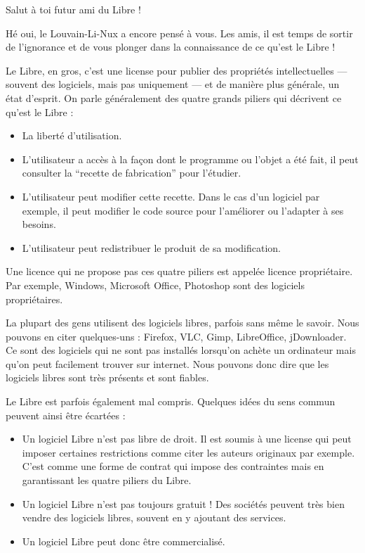 \documentclass[12pt]{../fiche}
\begin{document}


Salut à toi futur ami du Libre ! 
\vspace{0.8em}

Hé oui, le Louvain-Li-Nux a encore pensé à vous. Les amis, il est temps de sortir de l'ignorance et de vous plonger dans la connaissance de ce qu'est le Libre !
\vspace{0.8em}

Le Libre, en gros, c'est une license pour publier des propriétés intellectuelles --- souvent des logiciels, mais pas uniquement --- et de manière plus générale, un état d'esprit. On parle généralement des \og{}quatre grands piliers\fg{} qui décrivent ce qu'est le Libre :
\begin{itemize}
\item La liberté d'utilisation.
\item L'utilisateur a accès à la façon dont le programme ou l'objet a été fait, il peut consulter la “recette de fabrication” pour l'étudier.
\item L'utilisateur peut modifier cette recette. Dans le cas d'un logiciel par exemple, il peut modifier le code source pour l'améliorer ou l'adapter à ses besoins.
\item L'utilisateur peut redistribuer le produit de sa modification.
\end{itemize}

Une licence qui ne propose pas ces quatre piliers est appelée licence propriétaire. Par exemple, Windows, Microsoft Office, Photoshop sont des logiciels propriétaires.

\vspace{0.8em}

La plupart des gens utilisent des logiciels libres, parfois sans même le savoir. Nous pouvons en citer quelques-uns : Firefox, VLC, Gimp, LibreOffice, jDownloader. Ce sont des logiciels qui ne sont pas installés lorsqu'on achète un ordinateur mais qu'on peut facilement trouver sur internet. Nous pouvons donc dire que les logiciels libres sont très présents et sont fiables.
\vspace{0.8em}

Le Libre est parfois également mal compris. Quelques idées du sens commun peuvent ainsi être écartées :
\begin{itemize}
\item Un logiciel Libre n'est pas libre de droit. Il est soumis à une license qui peut imposer certaines restrictions comme citer les auteurs originaux par exemple. C'est comme une forme de contrat qui impose des contraintes mais en garantissant les quatre piliers du Libre.
\item Un logiciel Libre n'est pas toujours gratuit ! Des sociétés peuvent très bien vendre des logiciels libres, souvent en y ajoutant des services.
\item Un logiciel Libre peut donc être commercialisé.
\end{itemize}
\end{document}
